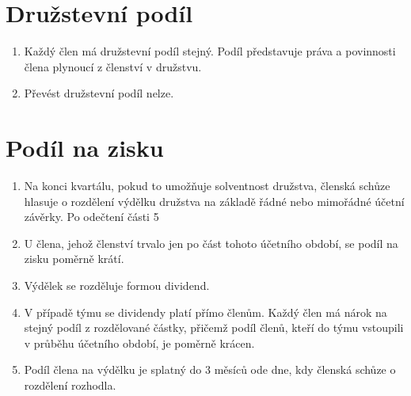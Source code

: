 \section{Družstevní podíl}
\begin{enumerate}
    \item Každý člen má družstevní podíl stejný. Podíl představuje práva a povinnosti člena plynoucí z členství v družstvu.
    \item Převést družstevní podíl nelze.
\end{enumerate}

\section{Podíl na zisku}
\begin{enumerate}
    \item Na konci kvartálu, pokud to umožňuje solventnost družstva, členská schůze hlasuje o rozdělení výdělku družstva na základě řádné nebo mimořádné účetní závěrky. Po odečtení části 5%
    \item U člena, jehož členství trvalo jen po část tohoto účetního období, se podíl na zisku poměrně krátí.
    \item Výdělek se rozděluje formou dividend. 
    \item V případě týmu se dividendy platí přímo členům. Každý člen má nárok na stejný podíl z rozdělované částky, přičemž podíl členů, kteří do týmu vstoupili v průběhu účetního období, je poměrně krácen.
    \item Podíl člena na výdělku je splatný do 3 měsíců ode dne, kdy členská schůze o rozdělení rozhodla.
\end{enumerate}


